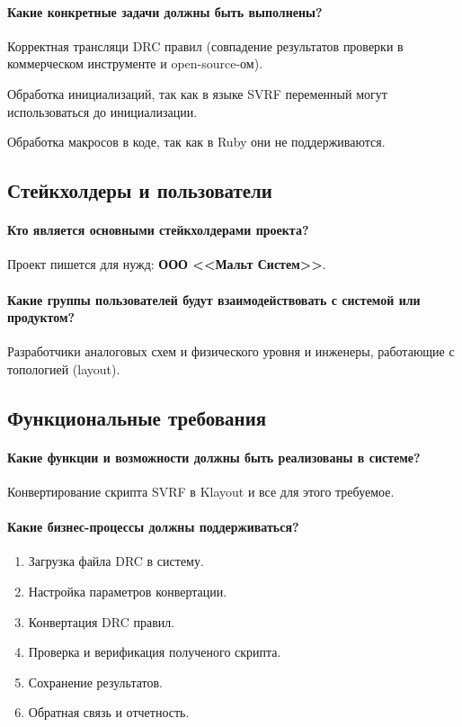 \paragraph{Какие конкретные задачи должны быть выполнены?}
Корректная трансляци DRC правил (совпадение результатов проверки
в коммерческом инструменте и open-source-ом).\par
Обработка инициализаций, так как в языке SVRF переменный могут использоваться
до инициализации.\par
Обработка макросов в коде, так как в Ruby они не поддерживаются.\par

\subsection{Стейкхолдеры и пользователи}

\paragraph{Кто является основными стейкхолдерами проекта?}
Проект пишется для нужд: \textbf{ООО <<Мальт Систем>>}.

\paragraph{Какие группы пользователей будут взаимодействовать
	с системой или продуктом?}
Разработчики аналоговых схем и физического уровня
и инженеры, работающие с топологией (layout).

\subsection{Функциональные требования}

\paragraph{Какие функции и возможности должны быть реализованы в системе?}
Конвертирование скрипта SVRF в Klayout и все для этого требуемое.

\paragraph{Какие бизнес-процессы должны поддерживаться?}

\begin{enumerate}
	\item Загрузка файла DRC в систему.
	\item Настройка параметров конвертации.
	\item Конвертация DRC правил.
	\item Проверка и верификация полученого скрипта.
	\item Сохранение результатов.
	\item Обратная связь и отчетность.
\end{enumerate}

